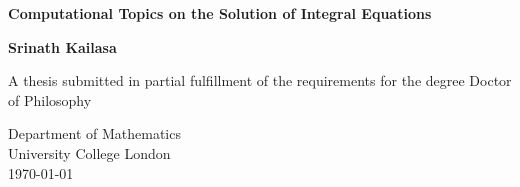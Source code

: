 \begin{titlepage}
    \begin{center}
        \vspace*{1cm}

        \Huge
        \textbf{Computational Topics on the Solution of Integral Equations}

        \Large
        \vspace{0.5cm}

        \vfill

        \textbf{Srinath Kailasa}

        \vspace{5cm}

        A thesis submitted in partial fulfillment of the requirements for the
        degree Doctor of Philosophy 

        \vspace{0.8cm}


        \large
        Department of Mathematics\\
        University College London\\
        \monthyeardate\today

    \end{center}
 \end{titlepage}